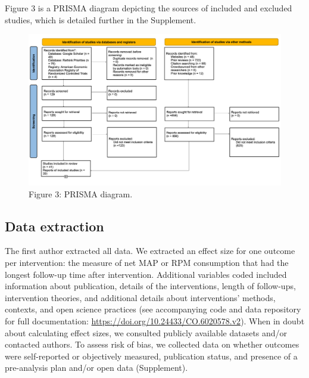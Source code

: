 \documentclass[sn-nature,referee,pdflatex]{sn-jnl}
\begin{document}
Figure 3 is a PRISMA diagram depicting the sources of included and
excluded studies, which is detailed further in the Supplement.

\begin{figure}[H]

{\centering \includegraphics[width=1.2\linewidth,]{./figures/prisma-diagram} 

}

\caption{Figure 3: PRISMA diagram.}\label{fig:prisma_diagram}
\end{figure}

\subsection{Data extraction}\label{sec3.3}

The first author extracted all data. We extracted an effect size for one
outcome per intervention: the measure of net MAP or RPM consumption that
had the longest follow-up time after intervention. Additional variables
coded included information about publication, details of the
interventions, length of follow-ups, intervention theories, and
additional details about interventions' methods, contexts, and open
science practices (see accompanying code and data repository for full
documentation: \url{https://doi.org/10.24433/CO.6020578.v2}). When in
doubt about calculating effect sizes, we consulted publicly available
datasets and/or contacted authors. To assess risk of bias, we collected
data on whether outcomes were self-reported or objectively measured,
publication status, and presence of a pre-analysis plan and/or open data
(Supplement).
\end{document}
